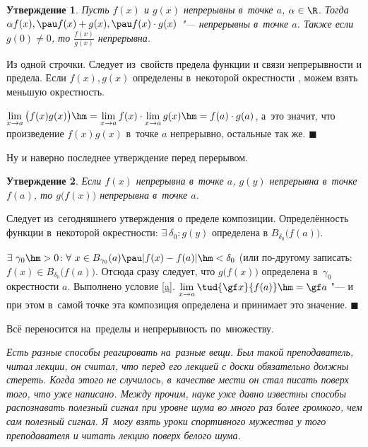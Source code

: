 \documentclass[a4paper,10pt,twoside]{article}
\newtheorem{Ut}{Утверждение}[section]
\newenvironment{Proof}
       {\par\noindent{\textbf{Доказательство.}}}
       {\hfill$\scriptstyle\blacksquare$}
\begin{document}
\begin{Ut}
Пусть $f(x)$ и $g(x)$ непрерывны в~точке $a$, $\alpha\in\R$. Тогда
$\alpha f(x),\pau f(x)+g(x),\pau f(x)\cdot g(x)$ "--- непрерывны в~точке
$a$. Также если $g(0)\neq 0$, то $\frac{f(x)}{g(x)}$ непрерывна.
\end{Ut}
\begin{Proof}
Из одной строчки. Следует из~свойств предела функции и связи непрерывности и предела.
Если $f(x),g(x)$ определены в~некоторой окрестности , можем взять меньшую окрестность.

$\lim\limits_{x\to a}\big(f(x)g(x)\big)\hm=\lim\limits_{x\to a}f(x)\cdot \lim\limits_{x\to a}g(x)\hm=f(a)\cdot g(a)$, а~это значит, что произведение $f(x)g(x)$ в~точке $a$ непрерывно, остальные так же.
\end{Proof}

Ну и наверно последнее утверждение перед перерывом.

\begin{Ut}
Если $f(x)$ непрерывна в~точке $a$, $g(y)$ непрерывна в~точке $f(a)$, то $g\big(f(x)\big)$ непрерывна в~точке $a$.
\end{Ut}

\begin{Proof}
Следует из~сегодняшнего утверждения о пределе композиции. Определённость функции в~некоторой окрестности: $\exists\  \delta_0\colon g(y)$ определена в
$B_{\delta_0}\big(f(a)\big)$.

$\exists\  \gamma_0\hm>0\colon \forall\  x\in B_{\gamma_0}(a)
\pau |f(x)-f(a)|\hm<\delta_0$ (или по-другому записать: $f(x)\in
B_{\delta_0}\big(f(a)\big)$.
 Отсюда сразу следует, что $g\big(f(x)\big)$
определена в~$\gamma_0$ окрестности $a$. Выполнено условие \ref{a}.
$\lim\limits_{x\to a}
\tud{\gf x}{f(a)}\hm=\gf a$
    "--- и при этом в~самой точке эта композиция определена и принимает это значение.
\end{Proof}

Всё переносится на~пределы и непрерывность по~множеству.

\textit{Есть разные способы реагировать на~разные вещи. Был такой
 преподаватель, читал лекции, он считал, что перед его лекцией с
 доски обязательно должны стереть. Когда этого не случилось, в~качестве
 мести он стал писать поверх того, что уже написано. Между прочим, науке уже давно известны способы распознавать полезный сигнал при уровне шума во много раз более громкого, чем сам полезный
 сигнал. Я~могу взять уроки спортивного мужества у того преподавателя и читать
 лекцию поверх белого шума.}
\end{document}
